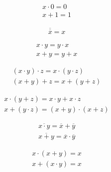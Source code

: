 \documentclass[12pt, openany, oneside]{book}
\begin{document}
\begin{tcolorbox}
	\begin{align}
		x \cdot 0 = 0 \\
		x + 1 = 1
	\end{align}
\end{tcolorbox}

\begin{tcolorbox}
	\begin{align}
		\overline {\overline x} = x
	\end{align}
\end{tcolorbox}

\begin{tcolorbox}
	\begin{align}
		x \cdot y = y \cdot x \\
		x + y = y + x
	\end{align}
\end{tcolorbox}

\begin{tcolorbox}
	\begin{align}
		(x \cdot y) \cdot z = x \cdot (y \cdot z) \\
		(x + y) + z = x + (y + z)
	\end{align}
\end{tcolorbox}

\begin{tcolorbox}
	\begin{align}
		x \cdot (y + z) = x \cdot y + x \cdot z \\
		x + (y \cdot z) = (x + y) \cdot (x + z)
	\end{align}
\end{tcolorbox}

\begin{tcolorbox}
	\begin{align}
		\overline{x \cdot y} = \overline x + \overline y \\
		\overline{x + y} = \overline x \cdot \overline y
	\end{align}
\end{tcolorbox}

\begin{tcolorbox}
	\begin{align}
		x \cdot (x + y) = x \\
		x + (x \cdot y) = x
	\end{align}
\end{tcolorbox}
\end{document}
